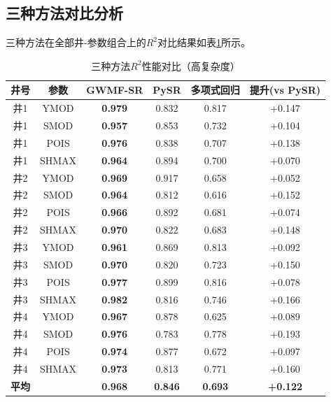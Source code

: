 \documentclass[a4paper,12pt]{ctexart}
\begin{document}
\subsection{三种方法对比分析}

三种方法在全部井-参数组合上的$R^2$对比结果如表\ref{tab:comparison}所示。

\begin{table}[htbp]
  \centering
  \caption{三种方法$R^2$性能对比（高复杂度）}
  \label{tab:comparison}
  \small
  \begin{tabular}{cccccc}
    \toprule
    井号 & 参数 & GWMF-SR & PySR & 多项式回归 & 提升(vs PySR) \\
    \midrule
    井1 & YMOD & \textbf{0.979} & 0.832 & 0.817 & +0.147 \\
    井1 & SMOD & \textbf{0.957} & 0.853 & 0.732 & +0.104 \\
    井1 & POIS & \textbf{0.976} & 0.838 & 0.707 & +0.138 \\
    井1 & SHMAX & \textbf{0.964} & 0.894 & 0.700 & +0.070 \\
    \midrule
    井2 & YMOD & \textbf{0.969} & 0.917 & 0.658 & +0.052 \\
    井2 & SMOD & \textbf{0.964} & 0.812 & 0.616 & +0.152 \\
    井2 & POIS & \textbf{0.966} & 0.892 & 0.681 & +0.074 \\
    井2 & SHMAX & \textbf{0.970} & 0.822 & 0.683 & +0.148 \\
    \midrule
    井3 & YMOD & \textbf{0.961} & 0.869 & 0.813 & +0.092 \\
    井3 & SMOD & \textbf{0.970} & 0.820 & 0.723 & +0.150 \\
    井3 & POIS & \textbf{0.977} & 0.899 & 0.816 & +0.078 \\
    井3 & SHMAX & \textbf{0.982} & 0.816 & 0.746 & +0.166 \\
    \midrule
    井4 & YMOD & \textbf{0.967} & 0.878 & 0.625 & +0.089 \\
    井4 & SMOD & \textbf{0.976} & 0.783 & 0.778 & +0.193 \\
    井4 & POIS & \textbf{0.974} & 0.877 & 0.672 & +0.097 \\
    井4 & SHMAX & \textbf{0.973} & 0.813 & 0.771 & +0.160 \\
    \midrule
    \textbf{平均} & & \textbf{0.968} & \textbf{0.846} & \textbf{0.693} & \textbf{+0.122} \\
    \bottomrule
  \end{tabular}
\end{table}
\end{document}

